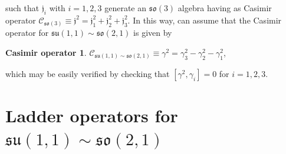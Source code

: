 \documentclass[12pt,a4paper]{report}
\theoremstyle{definition}
\newtheorem*{casimir}{Casimir operator}
\theoremstyle{remark}
\theoremstyle{remark}
\begin{document}
such that $\mathfrak{j}_i$ with $i=1,2,3$ generate an $\mathfrak{so}(3)$ algebra having as Casimir operator $\mathcal{C}_{\mathfrak{so}(3)}\equiv\mathfrak{j}^2=\mathfrak{j}_1^2+\mathfrak{j}_2^2+\mathfrak{j}_3^2$. In this way, can assume that the Casimir operator for $\mathfrak{su}(1,1)\sim\mathfrak{so}(2,1)$ is given by
\begin{casimir} $\mathcal{C}_{\mathfrak{su}(1,1)\sim\mathfrak{so}(2,1)}\equiv\gamma^2=\gamma_3^2-\gamma_2^2-\gamma_1^2$,
\end{casimir} \noindent
which may be easily verified by checking that $[\gamma^2,\gamma_i]=0$ for $i=1,2,3$.

\section{Ladder operators for $\mathfrak{su}(1,1)\sim\mathfrak{so}(2,1)$}
\end{document}

